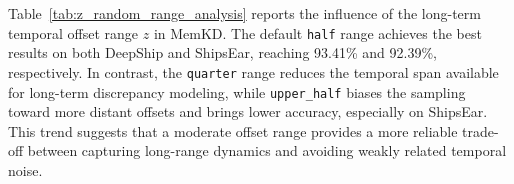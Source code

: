 ﻿\documentclass[lettersize,journal]{IEEEtran}
\begin{document}

Table~\ref{tab:z_random_range_analysis} reports the influence of the long-term temporal offset range $z$ in MemKD. The default \texttt{half} range achieves the best results on both DeepShip and ShipsEar, reaching 93.41\% and 92.39\%, respectively. In contrast, the \texttt{quarter} range reduces the temporal span available for long-term discrepancy modeling, while \texttt{upper\_half} biases the sampling toward more distant offsets and brings lower accuracy, especially on ShipsEar. This trend suggests that a moderate offset range provides a more reliable trade-off between capturing long-range dynamics and avoiding weakly related temporal noise.
\end{document}
